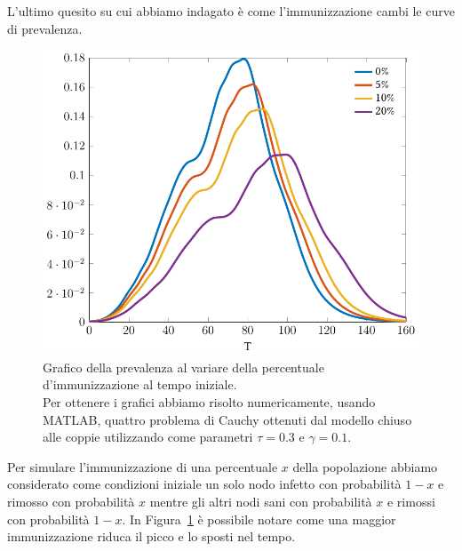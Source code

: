 L'ultimo quesito su cui abbiamo indagato \`e come l'immunizzazione cambi le curve di prevalenza.
\begin{figure}[htbp]
\centering
\includegraphics{Figure/minnesota_immunizzazione}
%
\caption[Grafico della prevalenza al variare della percentuale d'immunizzazionne.]{Grafico della prevalenza al variare della percentuale d'immunizzazione al tempo iniziale.\\ Per ottenere i grafici abbiamo risolto numericamente, usando MATLAB, quattro problema di Cauchy ottenuti dal modello chiuso alle coppie utilizzando come parametri $\tau=0.3$ e $\gamma=0.1$.}
\label{fig::minnesota_immunizzato}
\end{figure}
Per simulare l'immunizzazione di una percentuale $x$  della popolazione abbiamo considerato come condizioni iniziale un solo nodo infetto con probabilit\`a $1-x$ e rimosso con probabilit\`a $x$ mentre gli altri nodi sani con probabilit\`a $x$ e rimossi con probabilit\`a $1-x$.
In Figura~\ref{fig::minnesota_immunizzato} \`e possibile notare come una maggior immunizzazione riduca il picco e lo sposti nel tempo.
